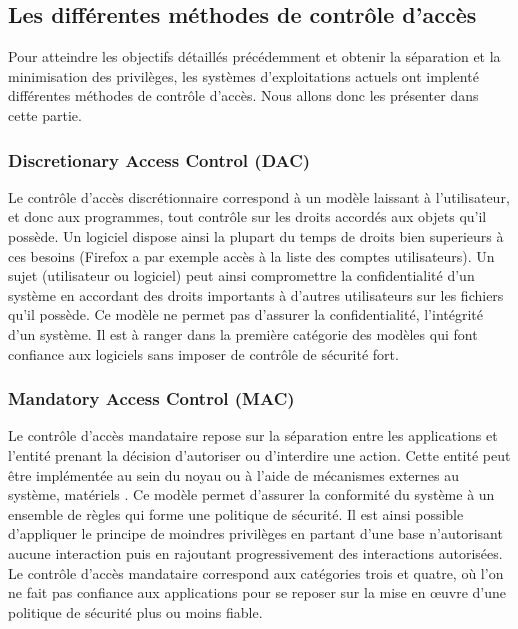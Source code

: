 \documentclass[pdftex,a4paper,titlepage,11pt]{article}
\begin{document}
\subsection{Les différentes méthodes de contrôle d'accès}

Pour atteindre les objectifs détaillés précédemment et obtenir la séparation et la minimisation des privilèges, les systèmes d'exploitations actuels ont implenté différentes méthodes de contrôle d'accès. Nous allons donc les présenter dans cette partie.

\subsubsection{Discretionary Access Control (DAC)}

Le contrôle d'accès discrétionnaire correspond à un modèle laissant à l'utilisateur, et donc aux programmes, tout contrôle sur les droits accordés aux objets qu'il possède. Un logiciel dispose ainsi la plupart du temps de droits bien superieurs à ces besoins (Firefox a par exemple accès à la liste des comptes utilisateurs). Un sujet (utilisateur ou logiciel) peut ainsi compromettre la confidentialité d'un système en accordant des droits importants à d'autres utilisateurs sur les fichiers qu'il possède. Ce modèle ne permet pas d'assurer la confidentialité, l'intégrité d'un système. Il est à ranger dans la première catégorie des modèles qui font confiance aux logiciels sans imposer de contrôle de sécurité fort.

\subsubsection{Mandatory Access Control (MAC)}

Le contrôle d'accès mandataire repose sur la séparation entre les applications et l'entité prenant la décision d'autoriser ou d'interdire une action. Cette entité peut être implémentée au sein du noyau ou à l'aide de mécanismes externes au système, matériels \cite{ITXT}. Ce modèle permet d'assurer la conformité du système à un ensemble de règles qui forme une politique de sécurité. Il est ainsi possible d'appliquer le principe de moindres privilèges en partant d'une base n'autorisant aucune interaction puis en rajoutant progressivement des interactions autorisées. Le contrôle d'accès mandataire correspond aux catégories trois et quatre, où l'on ne fait pas confiance aux applications pour se reposer sur la mise en \oe{}uvre d'une politique de sécurité plus ou moins fiable.
\end{document}
